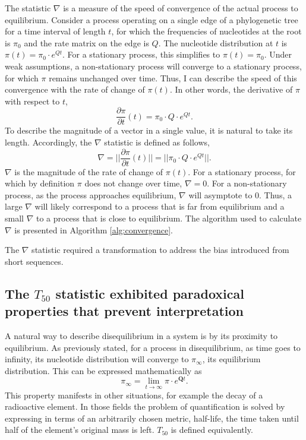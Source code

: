 The statistic $\nabla$ is a measure of the speed of convergence of the actual process to equilibrium. Consider a process operating on a single edge of a phylogenetic tree for a time interval of length $t$, for which the frequencies of nucleotides at the root is $\pi_0$ and the rate matrix on the edge is $Q$. The nucleotide distribution at $t$ is $\pi(t) = \pi_{0} \cdot e^{Qt}$. For a stationary process, this simplifies to $\pi(t) = \pi_{0}$. Under weak assumptions, a non-stationary process will converge to a stationary process, for which $\pi$ remains unchanged over time. Thus, I can describe the speed of this convergence with the rate of change of $\pi(t)$. In other words, the derivative of $\pi$ with respect to $t$,
\begin{equation}
\label{eq:dpi/dt}
\frac{\partial \pi}{\partial t}(t) = \pi_{0} \cdot Q \cdot e^{Qt}.
\end{equation}
To describe the magnitude of a vector in a single value, it is natural to take its length. Accordingly, the $\nabla$ statistic is defined as follows,
\begin{equation}
\label{eq:len-dpi/dt}
\nabla = ||\frac{\partial \pi}{\partial t}(t)|| =|| \pi_{0} \cdot Q \cdot e^{Qt}||.
\end{equation}
$\nabla$ is the magnitude of the rate of change of $\pi(t)$. For a stationary process, for which by definition $\pi$ does not change over time, $\nabla = 0$. For a non-stationary process, as the process approaches equilibrium, $\nabla$ will asymptote to $0$. Thus, a large $\nabla$ will likely correspond to a process that is far from equilibrium and a small $\nabla$ to a process that is close to equilibrium. The algorithm used to calculate $\nabla$ is presented in Algorithm \ref{alg:convergence}.



The $\nabla$ statistic required a transformation to address the bias introduced from short sequences.






\subsection*{The $T_{50}$ statistic exhibited paradoxical properties that prevent interpretation}

A natural way to describe disequilibrium in a system is by its proximity to equilibrium. As previously stated, for a process in disequilibrium, as time goes to infinity, its nucleotide distribution will converge to $\pi_\infty$, its equilibrium distribution. This can be expressed mathematically as 
$$\pi_\infty = \lim_{t \to \infty}\pi \cdot e^{\mathbf{Q}t}.$$ 
This property manifests in other situations, for example the decay of a radioactive element. In those fields the problem of quantification is solved by expressing in terms of an arbitrarily chosen metric, half-life, the time taken until half of the element's original mass is left. ${T_{50}}$ is defined equivalently.

